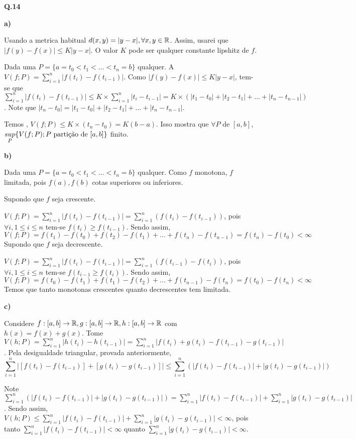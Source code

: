 \textbf{Q.14}

\textbf{a)}

Usando a metrica habitual $d(x, y) = |y-x|, \forall x,y \in \R$. Assim, usarei que \mbox{$|f(y)-f(x)| \le K|y-x|$}. O valor $K$ pode ser qualquer constante lipshitz de $f$.

Dada uma \particao $P = \{a=t_0 < t_1< \ldots < t_n = b\}$ qualquer. A \variacao \eh \mbox{$V(f;P) = \sum_{i = 1}^n|f(t_i) - f(t_{i-1})|$}. Como \mbox{$|f(y)-f(x)| \le K|y-x|$}, \entao tem-se que $\sum_{i = 1}^n|f(t_i) - f(t_{i-1})| \leq K\times\sum_{i = 1}^n|t_i - t_{i-1}| = K\times(|t_1 - t_0| + |t_2 -t_1| + \ldots + |t_n - t_{n-1}|)$. Note que $|t_n - t_0| = |t_1 - t_0| + |t_2 -t_1| + \ldots + |t_n - t_{n-1}|$.

Temos \entao, $V(f;P) \leq K\times (t_n - t_0) = K(b-a)$. Isso mostra que $\forall P$ \particao de $[a,b]$, $\underset{P}{sup}\{V(f;P); P \text{ \particao de }[a,b]\}$ \eh finito.

\textbf{b)}

Dada uma \particao $P = \{a=t_0 < t_1< \ldots < t_n = b\}$ qualquer. Como $f$ monotona, \entao $f$ limitada, pois $f(a),f(b)$ \sao cotas superiores ou inferiores.

Supondo que $f$ seja crescente.

$V(f;P) = \sum_{i = 1}^n|f(t_i) - f(t_{i-1})| = \sum_{i = 1}^n(f(t_i) - f(t_{i-1}))$, pois $\forall i, 1 \le i \le n$ tem-se $f(t_i) \ge f(t_{i-1})$. Sendo assim,
$$V(f;P) = f(t_1) - f(t_0) + f(t_2) - f(t_1) + \ldots + f(t_n) - f(t_{n-1}) = f(t_n) - f(t_0)<\infty$$
Supondo que $f$ seja decrescente.

$V(f;P) = \sum_{i = 1}^n|f(t_i) - f(t_{i-1})| = \sum_{i = 1}^n(f(t_{i-1}) - f(t_i))$, pois $\forall i, 1 \le i \le n$ tem-se $f(t_{i-1} \ge f(t_i))$. Sendo assim,
$$V(f;P) = f(t_0) - f(t_1) + f(t_1) - f(t_2) + \ldots + f(t_{n-1}) - f(t_n) = f(t_0) - f(t_n)<\infty$$
Temos \entao que tanto monotonas crescentes quanto decrescentes tem \variacao limitada.

\textbf{c)}

Considere $f:[a,b]\rightarrow\R, g:[a,b]\rightarrow\R, h:[a,b]\rightarrow\R$ com $h(x) = f(x) + g(x)$. Tome $V(h;P) = \sum_{i = 1}^n|h(t_i) - h(t_{i-1})| = \sum_{i = 1}^n|f(t_i) + g(t_i) - f(t_{i-1}) - g(t_{i-1})|$. Pela desigualdade triangular, provada anteriormente, 
$$\sum_{i = 1}^n|[f(t_i) - f(t_{i-1})] + [g(t_i) - g(t_{i-1})]| \leq
\sum_{i = 1}^n(|f(t_i) - f(t_{i-1})| + |g(t_i) - g(t_{i-1})|)$$

Note \mbox{$\sum_{i = 1}^n(|f(t_i) - f(t_{i-1})| + |g(t_i) - g(t_{i-1})|) = \sum_{i = 1}^n|f(t_i) - f(t_{i-1})| + \sum_{i = 1}^n |g(t_i) - g(t_{i-1})|$}. Sendo assim, $V(h;P) \leq \sum_{i = 1}^n|f(t_i) - f(t_{i-1})| + \sum_{i = 1}^n |g(t_i) - g(t_{i-1})| < \infty$, pois tanto $\sum_{i = 1}^n|f(t_i) - f(t_{i-1})| < \infty$ quanto $\sum_{i = 1}^n |g(t_i) - g(t_{i-1})| < \infty$.

